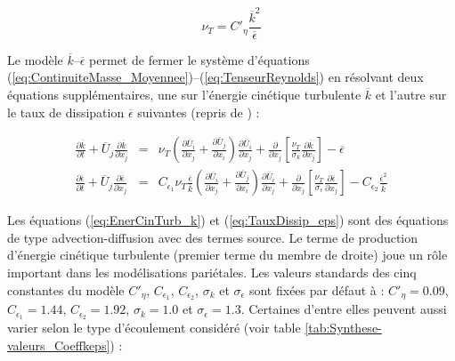 \begin{equation}
\nu_{T}=C'_{\eta}\frac{\overline{k}^{2}}{\overline{\epsilon}}\label{eq:nu_T_RANS}
\end{equation}


Le mod\`ele $\overline{k}$--$\overline{\epsilon}$ permet de fermer
le syst\`eme d'\'equations (\ref{eq:ContinuiteMasse_Moyennee})--(\ref{eq:TenseurReynolds})
en r\'esolvant deux \'equations suppl\'ementaires, une sur l'\'energie cin\'etique
turbulente $\overline{k}$ et l'autre sur le taux de dissipation $\overline{\epsilon}$
suivantes \cite[p. 469]{Book_Chassaing} (repris de \cite[Eq. (2.2-1 et 2.2-2)]{Launder-Spalding_NumCompTurbFlow1974})
:

\begin{subequations}

\begin{eqnarray}
\frac{\partial\overline{k}}{\partial t}+\overline{U}_{j}\frac{\partial\overline{k}}{\partial x_{j}} & = & \nu_{T}\left(\frac{\partial\overline{U}_{i}}{\partial x_{j}}+\frac{\partial\overline{U}_{j}}{\partial x_{i}}\right)\frac{\partial\overline{U}_{i}}{\partial x_{j}}+\frac{\partial}{\partial x_{j}}\left[\frac{\nu_{T}}{\sigma_{k}}\frac{\partial\overline{k}}{\partial x_{j}}\right]-\overline{\epsilon}\label{eq:EnerCinTurb_k}\\
\frac{\partial\overline{\epsilon}}{\partial t}+\overline{U}_{j}\frac{\partial\overline{\epsilon}}{\partial x_{j}} & = & C_{\epsilon_{1}}\nu_{T}\frac{\overline{\epsilon}}{\overline{k}}\left(\frac{\partial\overline{U}_{i}}{\partial x_{j}}+\frac{\partial\overline{U}_{j}}{\partial x_{i}}\right)\frac{\partial\overline{U}_{i}}{\partial x_{j}}+\frac{\partial}{\partial x_{j}}\left[\frac{\nu_{T}}{\sigma_{\epsilon}}\frac{\partial\overline{\epsilon}}{\partial x_{j}}\right]-C_{\epsilon_{2}}\frac{\overline{\epsilon}^{2}}{\overline{k}}\label{eq:TauxDissip_eps}
\end{eqnarray}


\end{subequations}

Les \'equations (\ref{eq:EnerCinTurb_k}) et (\ref{eq:TauxDissip_eps})
sont des \'equations de type advection-diffusion avec des termes source.
Le terme de production d\textquoteright \'energie cin\'etique turbulente
(premier terme du membre de droite) joue un r\^ole important dans les
mod\'elisations pari\'etales. Les valeurs standards des cinq constantes
du mod\`ele $C'_{\eta}$, $C_{\epsilon_{1}}$, $C_{\epsilon_{2}}$,
$\sigma_{k}$ et $\sigma_{\epsilon}$ sont fix\'ees par d\'efaut \`a : $C'_{\eta}=0.09$,
$C_{\epsilon_{1}}=1.44$, $C_{\epsilon_{2}}=1.92$, $\sigma_{k}=1.0$
et $\sigma_{\epsilon}=1.3$. Certaines d'entre elles peuvent aussi
varier selon le type d'\'ecoulement consid\'er\'e (voir table \ref{tab:Synthese-valeurs_Coeffkeps})
:

